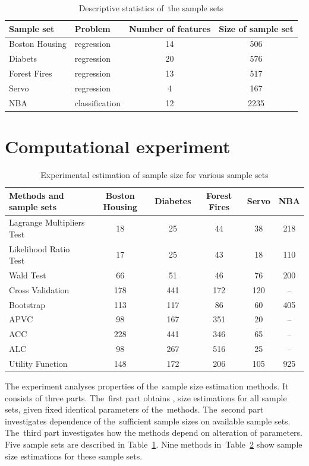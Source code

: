 \documentclass[
11pt,%
tightenlines,%
twoside,%
onecolumn,%
nofloats,%
nobibnotes,%
nofootinbib,%
superscriptaddress,%
noshowpacs,%
centertags]%
{revtex4}
\begin{document}
\begin{table}[!hbp]
\caption{ Descriptive statistics of~the sample sets}
\label{table20}
\begin{tabular}{l|l|c|c}
\hline
	\centering Sample set & Problem & Number of features & Size of sample set\\ 
	\hline 	Boston Housing 	&regression		&14 & 506\\
	\hline	Diabets 				& regression		&20 & 576\\
	\hline	Forest Fires 			& regression		& 13 & 517\\
 	\hline	Servo 					& regression 	& 4 & 167\\
	\hline	NBA				 		& classification	& 12 & 2235\\
\hline
\end{tabular}
\end{table} 
	 
\section{Computational experiment}
\begin{table}[!htp]
\caption{Experimental estimation of sample size  for various sample sets}
\label{table2}
\begin{tabular}{l|c|c|c|c|c}
\hline
 Methods and sample sets & Boston Housing & Diabetes & Forest Fires & Servo & NBA \\ \hline
Lagrange Multipliers Test & 18 & 25 & 44 & 38 & 218 \\ \hline
Likelihood Ratio Test & 17 & 25 & 43 & 18 & 110 \\ \hline
Wald Test & 66 & 51 & 46 & 76 & 200 \\ \hline
Cross Validation & 178 & 441 & 172 & 120 & -- \\ \hline
Bootstrap & 113 & 117 & 86 & 60 & 405 \\ \hline
APVC & 98 & 167 & 351 & 20 & -- \\ \hline
ACC & 228 & 441 & 346 & 65 & -- \\ \hline
ALC & 98 & 267 & 516 & 25 & -- \\ \hline
Utility Function & 148 & 172 & 206 & 105 & 925 \\ \hline
\end{tabular}
\end{table}

The experiment analyses  properties of the~sample size estimation methods. It consists of three parts. The~first part obtains , size estimations for all sample sets, given fixed identical parameters of the~methods. The~second part investigates dependence of the~sufficient sample sizes on available sample sets. The~third part investigates how the methods depend on alteration of parameters. Five sample sets are described in Table~\ref{table20}. Nine methods in~Table~\ref{table2} show sample size estimations for these sample sets. 
 
\end{document}
